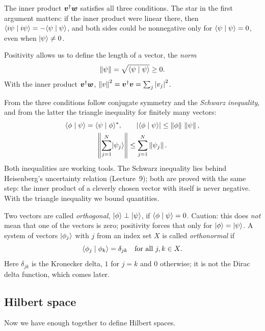 The inner product $\boldsymbol{v}^{\dagger}\boldsymbol{w}$ satisfies all three conditions. The star in the first argument matters: if the inner product were linear there, then $\langle i\psi \mid i\psi \rangle = -\langle \psi \mid \psi \rangle$, and both sides could be nonnegative only for $\langle \psi \mid \psi \rangle = 0$, even when $\lvert \psi \rangle \neq 0$.

Positivity allows us to define the length of a vector, the \emph{norm}
\begin{equation}
	\left\lVert \psi \right\rVert = \sqrt{\langle \psi \mid \psi \rangle} \geq 0.
\end{equation}
With the inner product $\boldsymbol{v}^{\dagger}\boldsymbol{w}$, $\left\lVert v \right\rVert^2 = \boldsymbol{v}^{\dagger}\boldsymbol{v} = \sum_j\left\lvert v_j \right\rvert^2$.

From the three conditions follow conjugate symmetry and the \emph{Schwarz inequality}, and from the latter the triangle inequality for finitely many vectors:
\begin{equation}
	\begin{gathered}
		\langle \phi \mid \psi \rangle = \langle \psi \mid \phi \rangle^*, \qquad
		\left\lvert \langle \phi \mid \psi \rangle \right\rvert \leq \left\lVert \phi \right\rVert\,\left\lVert \psi \right\rVert, \\
		\left\lVert \sum_{j=1}^{N}\lvert \psi_j \rangle \right\rVert \leq \sum_{j=1}^{N}\left\lVert \psi_j \right\rVert.
	\end{gathered}
\end{equation}
Both inequalities are working tools. The Schwarz inequality lies behind Heisenberg's uncertainty relation (Lecture~9); both are proved with the same step: the inner product of a cleverly chosen vector with itself is never negative. With the triangle inequality we bound quantities.

Two vectors are called \emph{orthogonal}, $\lvert \phi \rangle \perp \lvert \psi \rangle$, if $\langle \phi \mid \psi \rangle = 0$. Caution: this does \emph{not} mean that one of the vectors is zero; positivity forces that only for $\lvert \phi \rangle = \lvert \psi \rangle$. A system of vectors $\lvert \phi_j \rangle$ with $j$ from an index set $X$ is called \emph{orthonormal} if
\begin{equation}
	\langle \phi_j \mid \phi_k \rangle = \delta_{jk} \quad \text{for all } j,k\in X.
\end{equation}
Here $\delta_{jk}$ is the Kronecker delta, $1$ for $j = k$ and $0$ otherwise; it is not the Dirac delta function, which comes later.

\subsection{Hilbert space}
Now we have enough together to define Hilbert spaces.

